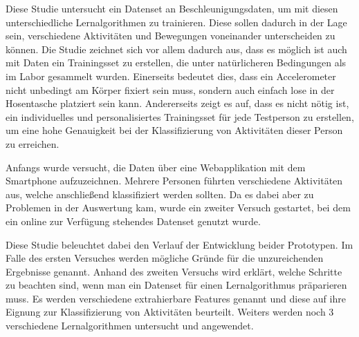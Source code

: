 
Diese Studie untersucht ein Datenset an Beschleunigungsdaten, um mit diesen unterschiedliche Lernalgorithmen zu trainieren. Diese sollen dadurch in der Lage sein, verschiedene Aktivitäten und Bewegungen voneinander unterscheiden zu können. Die Studie zeichnet sich vor allem dadurch aus, dass es möglich ist auch mit Daten ein Trainingsset zu erstellen, die unter natürlicheren Bedingungen als im Labor gesammelt wurden. Einerseits bedeutet dies, dass ein Accelerometer nicht unbedingt am Körper fixiert sein muss, sondern auch einfach lose in der Hosentasche platziert sein kann. Andererseits zeigt es auf, dass es nicht nötig ist, ein individuelles und personalisiertes Trainingsset für jede Testperson zu erstellen, um eine hohe Genauigkeit bei der Klassifizierung von Aktivitäten dieser Person zu erreichen.

Anfangs wurde versucht, die Daten über eine Webapplikation mit dem Smartphone aufzuzeichnen. Mehrere Personen führten verschiedene Aktivitäten aus, welche anschließend klassifiziert werden sollten. Da es dabei aber zu Problemen in der Auswertung kam, wurde ein zweiter Versuch gestartet, bei dem ein online zur Verfügung stehendes Datenset genutzt wurde.

Diese Studie beleuchtet dabei den Verlauf der Entwicklung beider Prototypen. Im Falle des ersten Versuches werden mögliche Gründe für die unzureichenden Ergebnisse genannt. Anhand des zweiten Versuchs wird erklärt, welche Schritte zu beachten sind, wenn man ein Datenset für einen Lernalgorithmus präparieren muss. Es werden verschiedene extrahierbare Features genannt und diese auf ihre Eignung zur Klassifizierung von Aktivitäten beurteilt. Weiters werden noch 3 verschiedene Lernalgorithmen untersucht und angewendet.